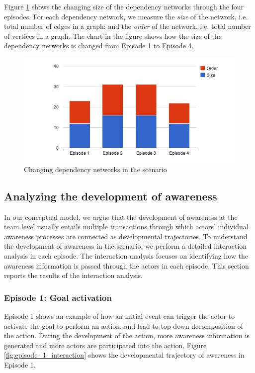 Figure \ref{fig:dynamics_of_dependencies} shows the changing size of the dependency networks through the four episodes. For each dependency network, we measure the \emph{size} of the network, i.e. total number of edges in a graph; and the \emph{order} of the network, i.e. total number of vertices in a graph. The chart in the figure shows how the size of the dependency networks is changed from Episode 1 to Episode 4.

\begin{figure}[htbp] %
	\centering
	\includegraphics[width=5.8in]{dynamics_of_dependencies.jpg} 
	\caption{Changing dependency networks in the scenario}
	\label{fig:dynamics_of_dependencies}
\end{figure}

\subsection{Analyzing the development of awareness} %
\label{sub:analyzing_the_development_of_awareness_}
In our conceptual model, we argue that the development of awareness at the team level usually entails multiple transactions through which actors' individual awareness processes are connected as developmental trajectories. To understand the development of awareness in the scenario, we perform a detailed interaction analysis in each episode. The interaction analysis focuses on identifying how the awareness information is passed through the actors in each episode. This section reports the results of the interaction analysis.

\subsubsection{Episode 1: Goal activation} %
\label{ssub:episode_1_goal_activation}
 Episode 1 shows an example of how an initial event can trigger the actor to activate the goal to perform an action, and lead to top-down decomposition of the action. During the development of the action, more awareness information is generated and more actors are participated into the action. Figure \ref{fig:episode_1_interaction} shows the developmental trajectory of awareness in Episode 1.

